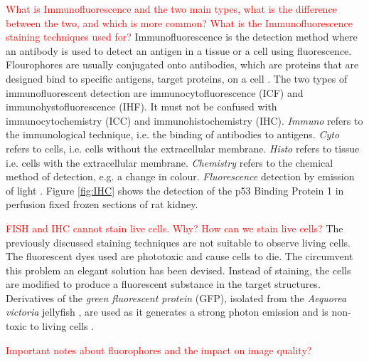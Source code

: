 \begin{definition}[Immunostaining]
	\textcolor{red}{What is Immunofluorescence and the two main types, what is the difference between the two, and which is more common? What is the Immunofluorescence staining techniques used for?}
	Immunofluorescence is the detection method where an antibody is used to detect an antigen in a tissue or a cell using fluorescence. Flourophores are usually conjugated onto antibodies, which are proteins that are designed bind to specific antigens, target proteins, on a cell \citep{CudeBurke2014}.
	The two types of immunofluorescent detection are immunocytofluorescence (ICF) and immunohystofluorescence (IHF).
	It must not be confused with immunocytochemistry (ICC) and immunohistochemistry (IHC).
	\textit{Immuno} refers to the immunological technique, i.e. the binding of antibodies to antigens.
	\textit{Cyto} refers to cells, i.e. cells without the extracellular membrane.
	\textit{Histo} refers to tissue i.e. cells with the extracellular membrane.
	\textit{Chemistry} refers to the chemical method of detection, e.g. a change in colour.
	\textit{Fluorescence} detection by emission of light \citep{Katikireddy2011}.
	Figure \ref{fig:IHC} shows the detection of the p53 Binding Protein 1 in perfusion fixed frozen sections of rat kidney.
\end{definition}

\begin{definition}
	\textcolor{red}{FISH and IHC cannot stain live cells. Why? How can we stain live cells?}
	The previously discussed staining techniques are not suitable to observe living cells.
	The fluorescent dyes used are phototoxic and cause cells to die. The circumvent this problem an elegant solution has been devised.
	Instead of staining, the cells are modified to produce a fluorescent substance in the target structures.
	Derivatives of the \textit{green fluorescent protein} (GFP), isolated from the \textit{Aequorea victoria} jellyfish \citep{Tsien1998,LichtmanConchello2005,Fatima2008}, are used as it generates a strong photon emission and is non-toxic to living cells \citep{Danek2012,Hubeny2008,Dobrucki2013}.
\end{definition}

\textcolor{red}{Important notes about fluorophores and the impact on image quality?}

